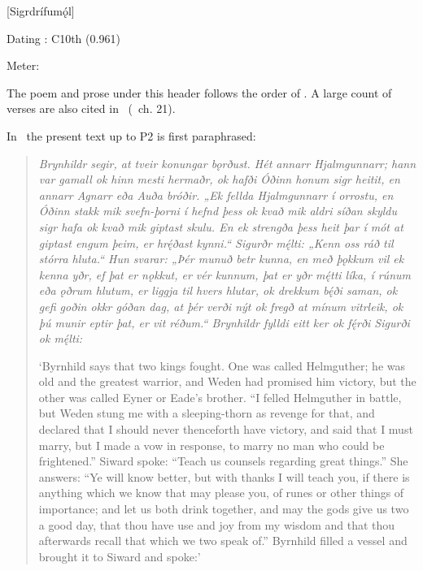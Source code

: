 [Sigrdrífumǫ́l]

\begin{flushright}%
Dating \parencite{Sapp2022}: C10th (0.961)

Meter: \Ljodahattr%
\end{flushright}


The poem and prose under this header follows the order of \Regius. A large count of verses are also cited in \VolsungaMS\ (\VolsungaSaga\ ch. 21).

In \VolsungaSaga\ the present text up to P2 is first paraphrased:

\begin{quote}
  \emph{Brynhildr segir, at tveir konungar bǫrðust. Hét annarr Hjalmgunnarr; hann var gamall ok hinn mesti hermaðr, ok hafði Óðinn honum sigr heitit, en annarr Agnarr eða Auða bróðir. „Ek fellda Hjalmgunnarr í orrostu, en Óðinn stakk mik svefn-þorni í hefnd þess ok kvað mik aldri síðan skyldu sigr hafa ok kvað mik giptast skulu. En ek strengða þess heit þar í mót at giptast engum þeim, er hrę́ðast kynni.“ Sigurðr mę́lti: „Kenn oss ráð til stórra hluta.“ Hun svarar: „Þér munuð betr kunna, en með þǫkkum vil ek kenna yðr, ef þat er nǫkkut, er vér kunnum, þat er yðr mę́tti líka, í rúnum eða ǫðrum hlutum, er liggja til hvers hlutar, ok drekkum bę́ði saman, ok gefi goðin okkr góðan dag, at þér verði nýt ok fregð at mínum vitrleik, ok þú munir eptir þat, er vit réðum.“ Brynhildr fylldi eitt ker ok fę́rði Sigurði ok mę́lti:}

  ‘Byrnhild says that two kings fought. One was called Helmguther; he was old and the greatest warrior, and Weden had promised him victory,
  but the other was called Eyner or Eade’s brother. “I felled Helmguther in battle, but Weden stung me with a sleeping-thorn as revenge for that, and declared that I should never thenceforth have victory, and said that I must marry, but I made a vow in response, to marry no man who could be frightened.” Siward spoke: “Teach us counsels regarding great things.” She answers: “Ye will know better, but with thanks I will teach you, if there is anything which we know that may please you, of runes or other things of importance; and let us both drink together, and may the gods give us two a good day, that thou have use and joy from my wisdom and that thou afterwards recall that which we two speak of.” Byrnhild filled a vessel and brought it to Siward and spoke:’
\end{quote}

